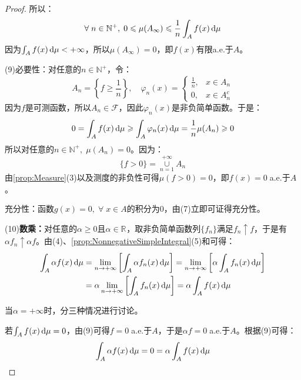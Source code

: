 \begin{proof}
	所以：
	\begin{equation*}
		\forall\;n\in\mathbb{N}^+,\;0\leqslant \mu(A_\infty)\leqslant\frac{1}{n}\int_{A}f(x)\mathop{}\!\mathrm{d}\mu
	\end{equation*}
	因为$\int_{A}f(x)\mathop{}\!\mathrm{d}\mu<+\infty$，所以$\mu(A_\infty)=0$，即$f(x)$有限a.e.于$A$。\par
	(9)必要性：对任意的$n\in\mathbb{N}^+$，令：
	\begin{equation*}
		A_n=\left\{f\geqslant\frac{1}{n}\right\},\quad
		\varphi_n(x)=
		\begin{cases}
			\frac{1}{n},&x\in A_n \\
			0,&x\in A_n^c
		\end{cases}
	\end{equation*}
	因为$f$是可测函数，所以$A_n\in \mathscr{F}$，因此$\varphi_n(x)$是非负简单函数。于是：
	\begin{equation*}
		0=\int_{A}f(x)\mathop{}\!\mathrm{d}\mu\geqslant\int_{A}\varphi_n(x)\mathop{}\!\mathrm{d}\mu=\frac{1}{n}\mu(A_n)\geqslant0
	\end{equation*}
	所以对任意的$n\in\mathbb{N}^+,\;\mu(A_n)=0$。因为：
	\begin{equation*}
		\{f>0\}=\underset{n=1}{\overset{+\infty}{\cup}}A_n
	\end{equation*}
	由\cref{prop:Measure}(3)以及测度的非负性可得$\mu(f>0)=0$，即$f(x)=0\;$a.e.于$A$。\par
	充分性：函数$g(x)=0,\;\forall\;x\in A$的积分为$0$，由(7)立即可证得充分性。\par
	(10)\textbf{数乘：}对任意的$\alpha\geqslant0$且$\alpha\in\mathbb{R}^{}$，取非负简单函数列$\{f_n\}$满足$f_n\uparrow f$，于是有$\alpha f_n\uparrow \alpha f$。由(4)、\cref{prop:NonnegativeSimpleIntegral}(5)和可得：
	\begin{align*}
		\int_{A}\alpha f(x)\mathop{}\!\mathrm{d}\mu&=\lim_{n\to+\infty}\left[\int_{A}\alpha f_n(x)\mathop{}\!\mathrm{d}\mu\right]=\lim_{n\to+\infty}\left[\alpha\int_{A}f_n(x)\mathop{}\!\mathrm{d}\mu\right] \\
		&=\alpha\lim_{n\to+\infty}\left[\int_{A}f_n(x)\mathop{}\!\mathrm{d}\mu\right]=\alpha\int_{A}f(x)\mathop{}\!\mathrm{d}\mu
	\end{align*}\par
	当$\alpha=+\infty$时，分三种情况进行讨论。\par
	若$\int_{A}f(x)\mathop{}\!\mathrm{d}\mu=0$，由(9)可得$f=0\;$a.e.于$A$，于是$\alpha f=0\;$a.e.于$A$。根据(9)可得：
	\begin{equation*}
		\int_{A}\alpha f(x)\mathop{}\!\mathrm{d}\mu=0=\alpha\int_{A}f(x)\mathop{}\!\mathrm{d}\mu
	\end{equation*}\par

\end{proof}
